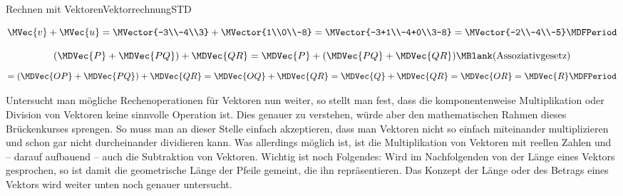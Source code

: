 \begin{MXContent}{Rechnen mit Vektoren}{Vektorrechnung}{STD}
\begin{MExercise}
\begin{MHint}{\iSolution}
\begin{MExerciseItems}
\item{\[\MVec{v}+\MVec{u}=\MVector{-3\\-4\\3}+\MVector{1\\0\\-8} = \MVector{-3+1\\-4+0\\3-8} =\MVector{-2\\-4\\-5} \MDFPeriod\]} 
\item{\[ (\MDVec{P}+\MDVec{P Q})+\MDVec{Q R} = \MDVec{P}+(\MDVec{P Q}+\MDVec{Q R})\MBlank \textrm{(Assoziativgesetz)}\] \[= (\MDVec{O P}+\MDVec{P Q})+\MDVec{Q R} = \MDVec{O Q}+\MDVec{Q R} = \MDVec{Q}+\MDVec{Q R} = \MDVec{O R} = \MDVec{R} \MDFPeriod\]}
\end{MExerciseItems} 
\end{MHint}
\end{MExercise}

Untersucht man mögliche Rechenoperationen für Vektoren nun weiter, so stellt man fest, dass die komponentenweise Multiplikation oder Division von Vektoren keine sinnvolle Operation ist. Dies genauer zu verstehen, würde aber den mathematischen Rahmen dieses Brückenkurses sprengen. So muss man an dieser Stelle einfach akzeptieren, dass man Vektoren nicht so einfach miteinander multiplizieren und schon gar nicht durcheinander dividieren kann. Was allerdings möglich ist, ist die Multiplikation von Vektoren mit reellen Zahlen und -- darauf aufbauend -- auch die Subtraktion von Vektoren. Wichtig ist noch Folgendes: Wird im Nachfolgenden von der Länge eines Vektors gesprochen, so ist damit die geometrische Länge der Pfeile gemeint, die ihn repräsentieren. Das Konzept der Länge oder des Betrags eines Vektors wird weiter unten noch genauer untersucht.


\end{MXContent}
